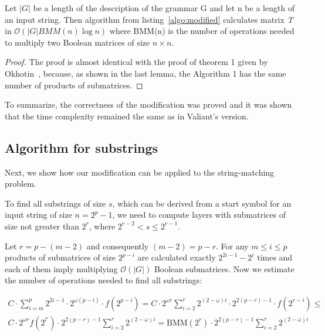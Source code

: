 \begin{theorem}
Let $|G|$ be a length of the description of the grammar G and let n be a length of an input string. Then algorithm from listing~\ref{algo:modified} calculates matrix \textit{T} in $\mathcal{O}(|G|BMM(n)\log{n})$ where BMM(n) is the number of operations needed to multiply two Boolean matrices of size $n \times n$.
\end{theorem}

\begin{proof}
The proof is almost identical with the proof of theorem 1 given by Okhotin~\cite{Okhotin:2014:PMM:2565359.2565379}, because, as shown in the last lemma, the Algorithm 1 has the same number of products of submatrices.
\end{proof}

To summarize, the correctness of the modification was proved and it was shown that the time complexity remained the same as in Valiant's version.


\subsection{Algorithm for substrings}

Next, we show how our modification can be applied to the string-matching problem.

To find all substrings of size $s$, which can be derived from a start symbol for an input string of size $n = 2^p - 1$, we need to compute layers with submatrices of size not greater than $2^{r}$, where $2^{r - 2} < s \le 2^{r - 1}$.

Let $r = p - (m - 2)$ and consequently $(m - 2) = p - r$.
For any  $m \le i \le p$ products of submatrices of size $2^{p - i}$ are calculated exactly $2^{2i - 1} - 2^{i}$ times and each of them imply multiplying $\mathcal{O}(|G|)$ Boolean submatrices.
Now we estimate the number of operations needed to find all substrings:

\begin{equation*}
\begin{array}{c}
C \cdot \sum\limits_{i=m}^p 2^{2i - 1} \cdot 2^{\omega(p - i)} \cdot f(2^{p - i}) =
C \cdot 2^{\omega r}\sum\limits_{i=2}^{r} 2^{(2 - \omega)i} \cdot 2^{2(p - r) - 1} \cdot f(2^{r - i}) \le \\
C \cdot 2^{\omega r} f(2^{l'}) \cdot 2^{2(p - r) - 1} \sum\limits_{i=2}^{r} 2^{(2 - \omega)i} =
\mathrm{BMM}(2^{r}) \cdot 2^{2(p - r) - 1} \sum\limits_{i=2}^{r} 2^{(2 - \omega)i}
\end{array}
\end{equation*}

